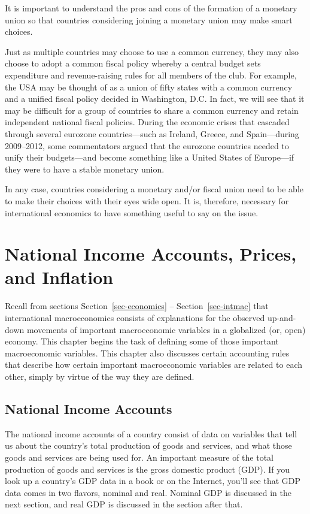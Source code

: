 \documentclass[
  letterpaper,
]{book}
\theoremstyle{plain}
\theoremstyle{remark}
\begin{document}
It is important to understand the pros and cons of the formation of a
monetary union so that countries considering joining a monetary union
may make smart choices.

Just as multiple countries may choose to use a common currency, they may
also choose to adopt a common fiscal policy whereby a central budget
sets expenditure and revenue-raising rules for all members of the club.
For example, the USA may be thought of as a union of fifty states with a
common currency and a unified fiscal policy decided in Washington, D.C.
In fact, we will see that it may be difficult for a group of countries
to share a common currency and retain independent national fiscal
policies. During the economic crises that cascaded through several
eurozone countries---such as Ireland, Greece, and Spain---during
2009--2012, some commentators argued that the eurozone countries needed
to unify their budgets---and become something like a United States of
Europe---if they were to have a stable monetary union.

In any case, countries considering a monetary and/or fiscal union need
to be able to make their choices with their eyes wide open. It is,
therefore, necessary for international economics to have something
useful to say on the issue.


\chapter{National Income Accounts, Prices, and
Inflation}\label{sec-niaccounts}

Recall from sections Section~\ref{sec-economics} --
Section~\ref{sec-intmac} that international macroeconomics consists of
explanations for the observed up-and-down movements of important
macroeconomic variables in a globalized (or, open) economy. This chapter
begins the task of defining some of those important macroeconomic
variables. This chapter also discusses certain accounting rules that
describe how certain important macroeconomic variables are related to
each other, simply by virtue of the way they are defined.

\section{National Income Accounts}\label{sec-nia}

The national income accounts of a country consist of data on variables
that tell us about the country's total production of goods and services,
and what those goods and services are being used for. An important
measure of the total production of goods and services is the gross
domestic product (GDP). If you look up a country's GDP data in a book or
on the Internet, you'll see that GDP data comes in two flavors, nominal
and real. Nominal GDP is discussed in the next section, and real GDP is
discussed in the section after that.
\end{document}
